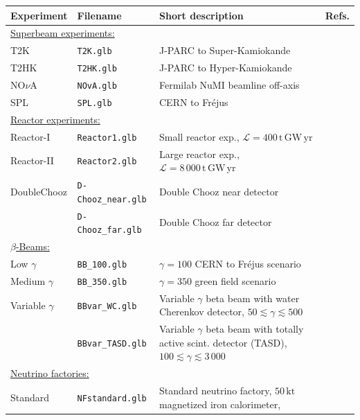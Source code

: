 \documentclass[12pt,a4paper]{article}
\newcommand{\Refs}{Refs.}
\begin{document}
\begin{table}[t!]
{\small
\begin{center}
\begin{tabular}{llp{7.0cm}c}
\hline
Experiment & Filename & Short description &  \Refs \\
\hline 
\multicolumn{4}{l}{\underline{Superbeam experiments:}} \\
T2K & {\tt T2K.glb} & J-PARC to Super-Kamiokande &  \cite{Itow:2001ee,Huber:2002mx} \\
T2HK & {\tt T2HK.glb} & J-PARC to Hyper-Kamiokande &  \cite{Itow:2001ee,Huber:2002mx} \\
NO$\nu$A & {\tt NOvA.glb} & Fermilab NuMI beamline off-axis  & \cite{Ambats:2004js,Yang_2004} \\
SPL & {\tt SPL.glb} & CERN to Fr\'{e}jus & \cite{Campagne:2006yx,Campagne:2004wt,Mezzetto:2003mm} \\[0.2cm]
\multicolumn{4}{l}{\underline{Reactor experiments:}} \\
{\sc Reactor-I} & {\tt Reactor1.glb} & Small reactor exp., 
$\mathcal{L} = 400 \, \mathrm{t} \, \mathrm{GW} \, \mathrm{yr}$
& \cite{Huber:2003pm} \\
{\sc Reactor-II} & {\tt Reactor2.glb} & Large reactor exp., 
$\mathcal{L} = 8\, 000 \, \mathrm{t} \, \mathrm{GW} \, \mathrm{yr}$ 
& \cite{Huber:2003pm} \\
Double{\sc Chooz} & {\tt D-Chooz\_near.glb} & Double Chooz near 
detector & \cite{Huber:2006vr} \\ 
 & {\tt D-Chooz\_far.glb} & Double Chooz far detector & \\[0.2cm]
\multicolumn{4}{l}{\underline{$\beta$-Beams:}} \\
Low $\gamma$ & {\tt BB\_100.glb} & $\gamma=100$ CERN to Fr\'{e}jus 
scenario & \cite{Campagne:2006yx} \\
Medium $\gamma$ & {\tt BB\_350.glb} & $\gamma=350$ green field scenario 
& \cite{Burguet-Castell:2005pa} \\
Variable $\gamma$ & {\tt BBvar\_WC.glb} & Variable $\gamma$ beta beam with water Cherenkov detector, $50 \lesssim \gamma \lesssim 500$ & \cite{Huber:2005jk} \\[0.2cm]
	& {\tt BBvar\_TASD.glb} & Variable $\gamma$ beta beam with totally active scint. detector (TASD), 
$100 \lesssim \gamma \lesssim 3\, 000$ & \cite{Huber:2005jk} \\[0.4cm]
\multicolumn{4}{l}{\underline{Neutrino factories:}} \\
Standard & {\tt NFstandard.glb} & Standard neutrino factory, $50 \, \mathrm{kt}$ magnetized iron calorimeter, 

\end{tabular}
\end{center}}
\end{table}
\end{document}

